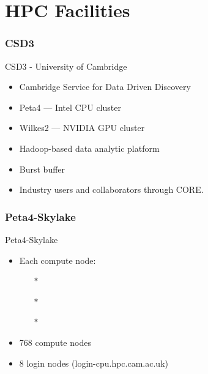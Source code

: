 \part{HPC Facilities}
\frame{\partpage}

\section{CSD3}
\begin{frame}{CSD3 - University of Cambridge}
\begin{itemize}
\item{Cambridge Service for Data Driven Discovery}
\pause
\medskip
\item{\alert{Peta4 --- Intel CPU cluster}}
\pause
\item{\alert{Wilkes2 --- NVIDIA GPU cluster}}
\pause
\medskip
\item{Hadoop-based data analytic platform}
\item{Burst buffer}
\item{Industry users and collaborators through CORE.}
\end{itemize}
\end{frame}

\section{Peta4-Skylake}
\begin{frame}{Peta4-Skylake}
\begin{itemize}
\item{Each compute node:}
\begin{itemize}
\item[$\ast$]{}
\item[$\ast$]{}
\item[$\ast$]{}
\end{itemize}
\item{768 compute nodes}
\item{8 login nodes (\alert{login-cpu.hpc.cam.ac.uk})}
\end{itemize}
\end{frame}

